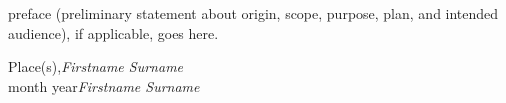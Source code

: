 %
%

\preface

preface (preliminary statement about origin, scope, purpose, plan, and intended audience), if applicable, goes here.

\vspace{\baselineskip}
\begin{flushright}\noindent
Place(s),\hfill {\it Firstname  Surname}\\
month year\hfill {\it Firstname  Surname}\\
\end{flushright}


